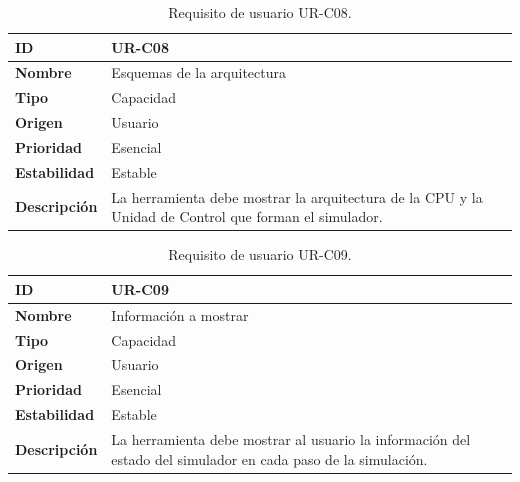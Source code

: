 \begin{center}
\begin{table}[htbp]
\centering
\caption{Requisito de usuario UR-C08.}
\begin{tabular}{@{}p{2.5cm} p{9cm}@{}} 
\toprule
\textbf{ID} 				& UR-C08 \\
\midrule
\textbf{Nombre} 			& Esquemas de la arquitectura \\
\midrule
\textbf{Tipo} 			& Capacidad \\
\midrule
\textbf{Origen} 			& Usuario \\
\midrule
\textbf{Prioridad}		& Esencial \\
\midrule
\textbf{Estabilidad} 		& Estable \\
\midrule
\textbf{Descripción} 	& La herramienta debe mostrar la arquitectura de la CPU y la Unidad de Control que forman el simulador. \\
\bottomrule
\end{tabular}
\label{tab:urc08}
\end{table}
\end{center}

\begin{center}
\begin{table}[htbp]
\centering
\caption{Requisito de usuario UR-C09.}
\begin{tabular}{@{}p{2.5cm} p{9cm}@{}} 
\toprule
\textbf{ID} 				& UR-C09 \\
\midrule
\textbf{Nombre} 			& Información a mostrar \\
\midrule
\textbf{Tipo} 			& Capacidad \\
\midrule
\textbf{Origen} 			& Usuario \\
\midrule
\textbf{Prioridad}		& Esencial \\
\midrule
\textbf{Estabilidad} 		& Estable \\
\midrule
\textbf{Descripción} 	& La herramienta debe mostrar al usuario la información del estado del simulador en cada paso de la simulación. \\
\bottomrule
\end{tabular}
\label{tab:urc09}
\end{table}
\end{center}



